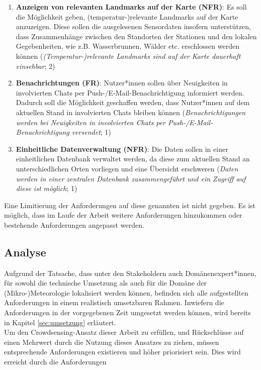 \begin{enumerate}
    \item \textbf{Anzeigen von relevanten Landmarks auf der Karte (\ac{NFR})}: Es soll die Möglichkeit geben, (temperatur-)relevante Landmarks auf der Karte anzuzeigen. Diese sollen die ausgelesenen Sensordaten insofern unterstützen, dass Zusammenhänge zwischen den Standorten der Stationen und den lokalen Gegebenheiten, wie z.B. Wasserbrunnen, Wälder etc. erschlossen werden können (\textit{(Temperatur-)relevante Landmarks sind auf der Karte dauerhaft einsehbar}; 2)
    \item \textbf{Benachrichtungen (\ac{FR})}: Nutzer*innen sollen über Neuigkeiten in involvierten Chats per Push-/E-Mail-Benachrichtigung informiert werden. Dadurch soll die Möglichkeit geschaffen werden, dass Nutzer*innen auf dem aktuellen Stand in involvierten Chats bleiben können (\textit{Benachrichtigungen werden bei Neuigkeiten in involvierten Chats per Push-/E-Mail-Benachrichtigung versendet}; 1)
    \item \textbf{Einheitliche Datenverwaltung (\ac{NFR})}: Die Daten sollen in einer einheitlichen Datenbank verwaltet werden, da diese zum aktuellen Stand an unterschiedlichen Orten vorliegen und eine Übersicht erschweren (\textit{Daten werden in einer zentralen Datenbank zusammengeführt und ein Zugriff auf diese ist möglich}; 1)
\end{enumerate}

Eine Limitierung der Anforderungen auf diese genannten ist nicht gegeben. Es ist möglich, dass im Laufe der Arbeit weitere Anforderungen hinzukommen oder bestehende Anforderungen angepasst werden.

\subsection{Analyse}
Aufgrund der Tatsache, dass unter den Stakeholdern auch Domänenexpert*innen, für sowohl die technische Umsetzung als auch für die Domäne der (Mikro-)Meteorologie lokalisiert werden können, befinden sich alle aufgestellten Anforderungen in einem realistisch umsetzbaren Rahmen. Inwiefern die Anforderungen in der vorgegebenen Zeit umgesetzt werden können, wird bereits in Kapitel \ref{sec:umsetzung} erläutert. \\ Um den Crowdsensing-Ansatz dieser Arbeit zu erfüllen, und Rückschlüsse auf einen Mehrwert durch die Nutzung dieses Ansatzes zu ziehen, müssen entsprechende Anforderungen existieren und höher priorisiert sein. Dies wird erreicht durch die Anforderungen 

